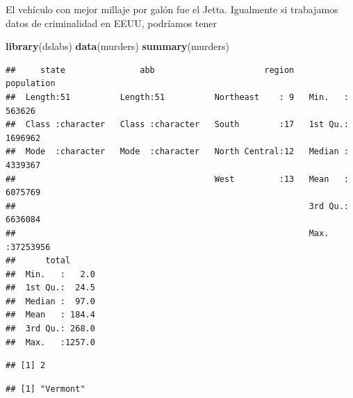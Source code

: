 \documentclass[
]{article}
\newenvironment{Shaded}{\begin{snugshade}}{\end{snugshade}}
\newcommand{\CommentTok}[1]{\textcolor[rgb]{0.56,0.35,0.01}{\textit{#1}}}
\newcommand{\FunctionTok}[1]{\textcolor[rgb]{0.13,0.29,0.53}{\textbf{#1}}}
\newcommand{\NormalTok}[1]{#1}
\newcommand{\OtherTok}[1]{\textcolor[rgb]{0.56,0.35,0.01}{#1}}
\newcommand{\SpecialCharTok}[1]{\textcolor[rgb]{0.81,0.36,0.00}{\textbf{#1}}}
\begin{document}
El vehículo con mejor millaje por galón fue el Jetta. Igualmente si
trabajamos datos de criminalidad en EEUU, podríamos tener

\begin{Shaded}
\begin{Highlighting}[]
\FunctionTok{library}\NormalTok{(dslabs)}
\FunctionTok{data}\NormalTok{(murders)}
\FunctionTok{summary}\NormalTok{(murders)}
\end{Highlighting}
\end{Shaded}

\begin{verbatim}
##     state               abb                      region     population      
##  Length:51          Length:51          Northeast    : 9   Min.   :  563626  
##  Class :character   Class :character   South        :17   1st Qu.: 1696962  
##  Mode  :character   Mode  :character   North Central:12   Median : 4339367  
##                                        West         :13   Mean   : 6075769  
##                                                           3rd Qu.: 6636084  
##                                                           Max.   :37253956  
##      total       
##  Min.   :   2.0  
##  1st Qu.:  24.5  
##  Median :  97.0  
##  Mean   : 184.4  
##  3rd Qu.: 268.0  
##  Max.   :1257.0
\end{verbatim}

\begin{Shaded}
\end{Shaded}

\begin{verbatim}
## [1] 2
\end{verbatim}

\begin{Shaded}
\end{Shaded}

\begin{verbatim}
## [1] "Vermont"
\end{verbatim}
\end{document}

